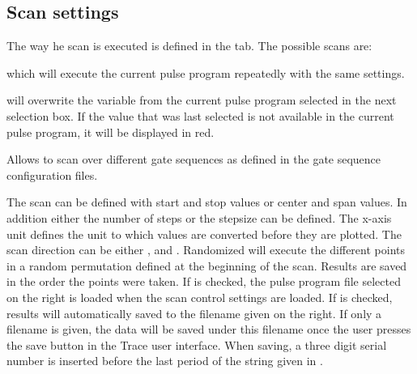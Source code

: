 \documentclass[11pt]{scrartcl}
\begin{document}
\subsection{Scan settings}
The  way he scan is executed is defined in the  tab. The possible scans are:
\begin{description}
\item {} which will execute the current pulse program repeatedly with the same settings.
\item {} will overwrite the variable from the current pulse program selected in the next selection box. If the value that was last selected is not available in the current pulse program, it will be displayed in red. 
\item {} Allows to scan over different gate sequences as defined in the gate sequence configuration files.
\end{description}
The scan can be defined with start and stop values or center and span values. In addition either the number of steps or the stepsize can be defined. The x-axis unit defines the unit to which values are converted before they are plotted. The scan direction can be either ,  and . Randomized will execute the different points in a random permutation defined at the beginning of the scan. Results are saved in the order the points were taken. If  is checked, the pulse program file selected on the right is loaded when the scan control settings are loaded. If  is checked, results will automatically saved to the filename given on the right. If only a filename is given, the data will be saved under this filename once the user presses the save button in the Trace user interface. When saving, a three digit serial number is inserted before the last period of the string given in .
\end{document}
